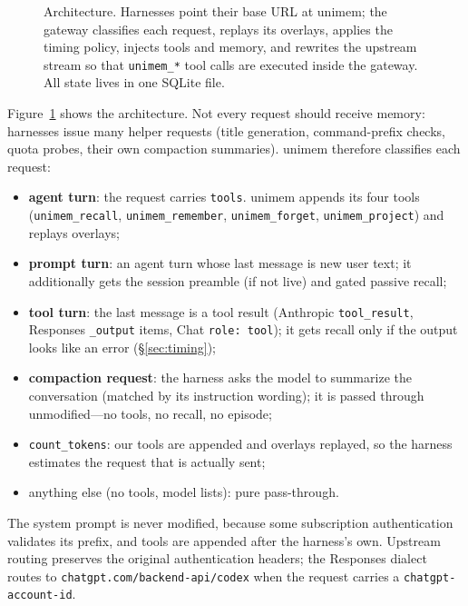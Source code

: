\documentclass[10pt,twocolumn]{article}
\newcommand{\sys}{\textsf{unimem}}
\newcommand{\code}[1]{\texttt{\small #1}}
\begin{document}
\begin{figure}[t]
\caption{Architecture. Harnesses point their base URL at \sys{}; the gateway classifies each request, replays its
overlays, applies the timing policy, injects tools and memory, and rewrites the upstream stream so that
\code{unimem\_*} tool calls are executed inside the gateway. All state lives in one SQLite file.}
\label{fig:arch}
\end{figure}

Figure~\ref{fig:arch} shows the architecture. Not every request should receive memory: harnesses issue many helper
requests (title generation, command-prefix checks, quota probes, their own compaction summaries). \sys{} therefore
classifies each request:
\begin{itemize}
\item \textbf{agent turn}: the request carries \code{tools}. \sys{} appends its four tools (\code{unimem\_recall},
  \code{unimem\_remember}, \code{unimem\_forget}, \code{unimem\_project}) and replays overlays;
\item \textbf{prompt turn}: an agent turn whose last message is new user text; it additionally gets the session
  preamble (if not live) and gated passive recall;
\item \textbf{tool turn}: the last message is a tool result (Anthropic \code{tool\_result}, Responses
  \code{*\_output} items, Chat \code{role:\,tool}); it gets recall only if the output looks like an error (\S\ref{sec:timing});
\item \textbf{compaction request}: the harness asks the model to summarize the conversation (matched by its
  instruction wording); it is passed through unmodified---no tools, no recall, no episode;
\item \code{count\_tokens}: our tools are appended and overlays replayed, so the harness estimates the request that is
  actually sent;
\item anything else (no tools, model lists): pure pass-through.
\end{itemize}
The system prompt is never modified, because some subscription authentication validates its prefix, and tools are
appended after the harness's own. Upstream routing preserves the original authentication headers; the Responses
dialect routes to \code{chatgpt.com/backend-api/codex} when the request carries a \code{chatgpt-account-id}.
\end{document}
